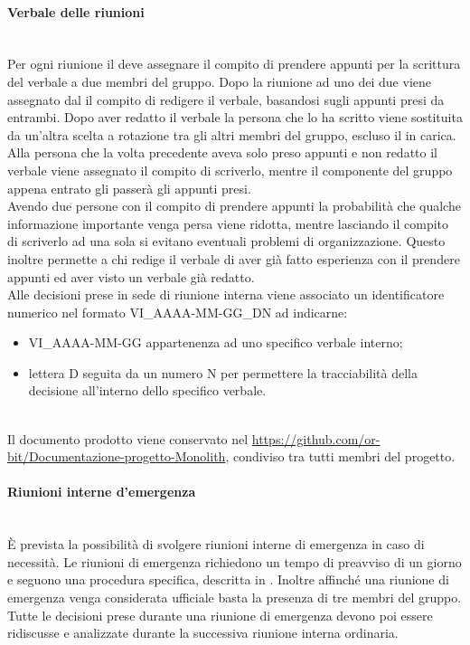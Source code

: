 \paragraph{Verbale delle riunioni}\label{sec:verbale_riunioni_interne}\mbox{}\\
Per ogni riunione il \Responsabile{} deve assegnare il compito di prendere appunti per la scrittura del verbale a due membri del gruppo. Dopo la riunione ad uno dei due viene assegnato dal \Responsabile{} il compito di redigere il verbale, basandosi sugli appunti presi da entrambi. 
Dopo aver redatto il verbale la persona che lo ha scritto viene sostituita da un’altra scelta a rotazione tra gli altri membri del gruppo, escluso il \Responsabile{} in carica. Alla persona che la volta precedente aveva solo preso appunti e non redatto il verbale viene assegnato il compito di scriverlo, mentre il componente del gruppo appena entrato gli passerà gli appunti presi.\\
Avendo due persone con il compito di prendere appunti la probabilità che qualche informazione importante venga persa viene ridotta, mentre lasciando il compito di scriverlo ad una sola si evitano eventuali problemi di organizzazione.
Questo inoltre permette a chi redige il verbale di aver già fatto esperienza con il prendere appunti ed aver visto un verbale già redatto.\\
Alle decisioni prese in sede di riunione interna viene associato un identificatore numerico nel formato VI_AAAA-MM-GG_DN ad indicarne:
\begin{itemize}
	\item VI_AAAA-MM-GG appartenenza ad uno specifico verbale interno;
	\item lettera D seguita da un numero N per permettere la tracciabilità della decisione all'interno dello specifico verbale.
\end{itemize}\\
Il documento prodotto viene conservato nel 
\sloppy \url{https://github.com/or-bit/Documentazione-progetto-Monolith}, condiviso tra tutti membri del progetto.

\paragraph{Riunioni interne d'emergenza}\label{sec:riunioni_emergenza}\mbox{}\\
\`{E} prevista la possibilità di svolgere riunioni interne di emergenza in caso di necessità. Le riunioni di emergenza richiedono un tempo di preavviso di un giorno e seguono una procedura specifica, descritta in . Inoltre affinché una riunione di emergenza venga considerata ufficiale basta la presenza di tre membri del gruppo.\\
Tutte le decisioni prese durante una riunione di emergenza devono poi essere ridiscusse e analizzate durante la successiva riunione interna ordinaria.

